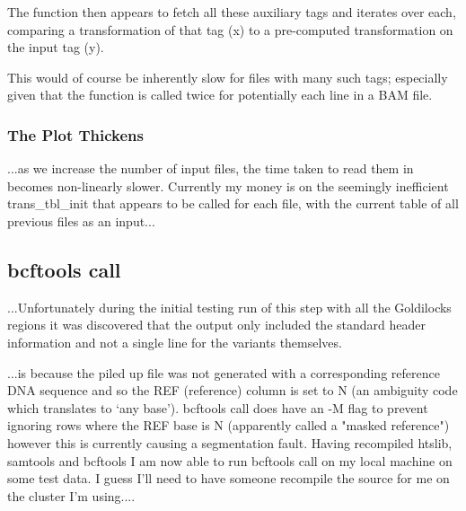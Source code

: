 The function then appears to fetch all these auxiliary tags and iterates over
each, comparing a transformation of that tag (x) to a pre-computed
transformation on the input tag (y).

This would of course be inherently slow for files with many such tags;
especially given that the function is called twice for potentially each line in
a BAM file.


\subsubsection{The Plot Thickens}

...as we increase the number of input files, the time taken to
read them in becomes non-linearly slower. Currently my money is on the seemingly
inefficient trans\_tbl\_init that appears to be called for each file, with the
current table of all previous files as an input...


\subsection{bcftools call}

...Unfortunately during the initial testing run of this step with all the
Goldilocks regions it was discovered that the output only included the standard
header information and not a single line for the variants themselves.

...is because the piled up file was not generated with a corresponding reference
DNA sequence and so the REF (reference) column is set to N (an ambiguity code
which translates to ‘any base’).  bcftools call does have an -M flag to prevent
ignoring rows where the REF base is N (apparently called a "masked reference")
however this is currently causing a segmentation fault.  Having recompiled
htslib, samtools and bcftools I am now able to run bcftools call on my local
machine on some test data. I guess I’ll need to have someone recompile the
source for me on the cluster I’m using....

